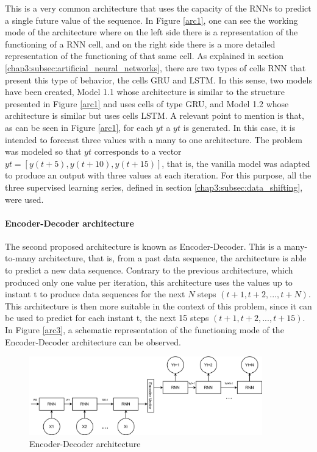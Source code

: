 This is a very common architecture that uses the capacity of the \ac{RNN}s to predict a single future value of the sequence. In Figure \ref{arc1}, one can see the working mode of the architecture where on the left side there is a representation of the functioning of a RNN cell, and on the right side there is a more detailed representation of the functioning of that same cell. As explained in section \ref{chap3:subsec:artificial_neural_networks}, there are two types of cells \ac{RNN} that present this type of behavior, the cells \ac{GRU} and \ac{LSTM}. In this sense, two models have been created, Model 1.1 whose architecture is similar to the structure presented in Figure \ref{arc1} and uses cells of type \ac{GRU}, and Model 1.2 whose architecture is similar but uses cells \ac{LSTM}. A relevant point to mention is that, as can be seen in Figure \ref{arc1}, for each $yt$ a $yt$ is generated. In this case, it is intended to forecast three values with a many to one architecture. The problem was modeled so that $yt$ corresponds to a vector $yt = [y(t+5), y(t+10), y(t+15)]$, that is, the vanilla model was adapted to produce an output with three values at each iteration. For this purpose, all the three supervised learning series, defined in section \ref{chap3:subsec:data_shifting}, were used.



\paragraph{Encoder-Decoder architecture}

The second proposed architecture is known as Encoder-Decoder.  This is a many-to-many architecture, that is, from a past data sequence, the architecture is able to predict a new data sequence. Contrary to the previous architecture, which produced only one value per iteration, this architecture uses the values up to instant t to produce data sequences for the next $N$ steps $(t+1, t+2, ..., t+N)$. This architecture is then more suitable in the context of this problem, since it can be used to predict for each instant t, the next 15 steps $(t+1, t+2, ..., t+15)$. In Figure \ref{arc3}, a schematic representation of the functioning mode of the Encoder-Decoder architecture can be observed. 

\begin{figure}[h!]
    \centering
    \begin{center}
    \includegraphics[width=0.9\textwidth]{Images/arc2.png}
    \caption{Encoder-Decoder architecture}
    \label{arc2}
    \end{center}
\end{figure}

